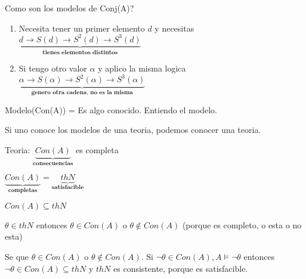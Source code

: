 \documentclass{amsart}
\begin{document}
Como son los modelos de Conj(A)?

\begin{enumerate}
	\item Necesita tener un primer elemento $d$ y necesitas $\underbrace{d \rightarrow S(d) \rightarrow S^2(d) \rightarrow S^3(d)}_{\textbf{tienes elementos distintos}}$
	\item Si tengo otro valor $\alpha$ y aplico la misma logica $\underbrace{\alpha \rightarrow S(\alpha) \rightarrow S^2(\alpha) \rightarrow S^3(\alpha)}_{\textbf{genero otra cadena, no es la misma}}$
\end{enumerate}

Modelo(Con(A)) = Es algo conocido. Entiendo el modelo.

Si uno conoce los modelos de una teoria, podemos conocer una teoria.

Teoria: $\underbrace{Con(A)}_{\textbf{consecuencias}}$ es completa

\begin{ejercicio}
$\underbrace{Con(A)}_{\textbf{completas}} = \underbrace{thN}_{\textbf{satisfacible}}$

$Con(A) \subseteq thN$

$\theta \in thN$ entonces $\theta \in Con(A)$ o $\theta \notin Con(A)$ (porque es completo, o esta o no esta)

Se que $\theta \in Con(A)$ o $\theta \notin Con(A)$. Si $\neg \theta \in Con(A), A \models \neg \theta$ entonces $\neg \theta \in Con(A) \subseteq thN$ y $thN$ es consistente, porque es satisfacible.

\end{ejercicio}
\end{document}
